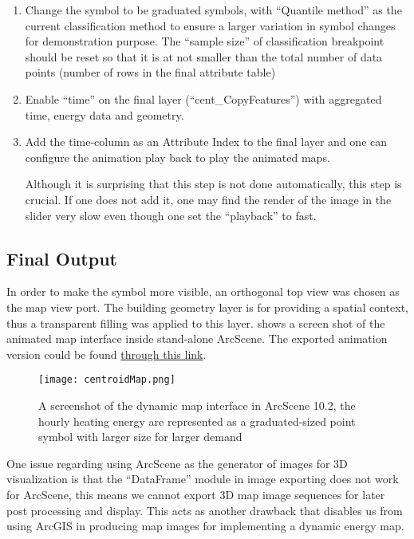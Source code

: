 \begin{enumerate}[1)]
\item Change the symbol to be graduated symbols, with ``Quantile
  method'' as the current classification method to ensure a larger
  variation in symbol changes for demonstration purpose. The ``sample
  size'' of classification breakpoint should be reset so that it is at
  not smaller than the total number of data points (number of rows in
  the final attribute table) 
  
\item Enable ``time'' on the final layer (``cent\_CopyFeatures'') with
  aggregated time, energy data and geometry.

\item Add the time-column as an Attribute Index to the final layer and
  one can configure the animation play back to play the animated
  maps. 

  Although it is surprising that this step is not done automatically,
  this step is crucial. If one does not add it, one may find the
  render of the image in the slider very slow even though one set the
  ``playback'' to fast.
\end{enumerate}

\subsection{Final Output}
In order to make the symbol more visible, an orthogonal top view was
chosen as the map view port. The building geometry layer is for
providing a spatial context, thus a transparent filling was applied to
this layer.  shows a screen shot of the animated
map interface inside stand-alone ArcScene. The exported animation
version could be found
\href{http://www.armechxyj.com/energy-mapping.html#slowAnime}{through
  this link}.

\begin{figure}[h!]
  \centering
  \texttt{[image: centroidMap.png]}
  \caption[Dynamic Map in ArcScene with Building Centroid]{A
    screenshot of the dynamic map interface in ArcScene 10.2, the
    hourly heating energy are represented as a graduated-sized point
    symbol with larger size for larger demand}
  \label{fig:centroidMap}
\end{figure}

One issue regarding using ArcScene as the generator of images for 3D
visualization is that the ``DataFrame'' module in image exporting does
not work for ArcScene, this means we cannot export 3D map image
sequences for later post processing and display. This acts as another
drawback that disables us from using ArcGIS in producing map images
for implementing a dynamic energy map.